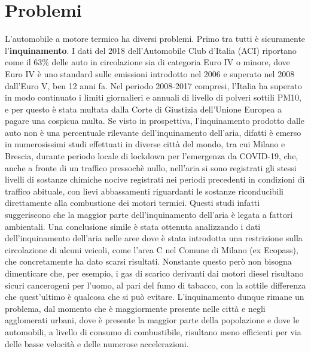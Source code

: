 \section{Problemi}

L'automobile a motore termico ha diversi problemi. Primo tra tutti è sicuramente l'\textbf{inquinamento}. I dati del 2018 dell'Automobile Club d'Italia (ACI) riportano come il 63\% delle auto in circolazione sia di categoria Euro IV o minore, dove Euro IV è uno standard sulle emissioni introdotto nel 2006 e superato nel 2008 dall'Euro V, ben 12 anni fa\cite{anfiastudiestatistiche}\cite{euroivstandard}. Nel periodo 2008-2017 compresi, l'Italia ha superato in modo continuato i limiti giornalieri e annuali di livello di polveri sottili PM10, e per questo è stata multata dalla Corte di Giustizia dell'Unione Europea a pagare una cospicua multa\cite{eunewssanzioneitalia}. Se visto in prospettiva, l'inquinamento prodotto dalle auto non è una percentuale rilevante dell'inquinamento dell'aria, difatti è emerso in numerosissimi studi effettuati in diverse città del mondo, tra cui Milano e Brescia\cite{collivignarelli2020}\cite{camaletti2020}, durante periodo locale di lockdown per l'emergenza da COVID-19, che, anche a fronte di un traffico pressochè nullo, nell'aria si sono registrati gli stessi livelli di sostanze chimiche nocive registrati nei periodi precedenti in condizioni di traffico abituale, con lievi abbassamenti riguardanti le sostanze riconducibili direttamente alla combustione dei motori termici. Questi studi infatti suggeriscono che la maggior parte dell'inquinamento dell'aria è legata a fattori ambientali. Una conclusione simile è stata ottenuta analizzando i dati dell'inquinamento dell'aria nelle aree dove è stata introdotta una restrizione sulla circolazione di alcuni veicoli, come l'area C nel Comune di Milano (ex Ecopass), che concretamente ha dato scarsi risultati\cite{trentini2014}. Nonstante questo però non bisogna dimenticare che, per esempio, i gas di scarico derivanti dai motori diesel risultano sicuri cancerogeni per l'uomo, al pari del fumo di tabacco, con la sottile differenza che quest'ultimo è qualcosa che si può evitare\cite{iarctable}. L'inquinamento dunque rimane un problema, dal momento che è maggiormente presente nelle città e negli agglomerati urbani, dove è presente la maggior parte della popolazione e dove le automobili, a livello di consumo di combustibile, risultano meno efficienti per via delle basse velocità e delle numerose accelerazioni.

